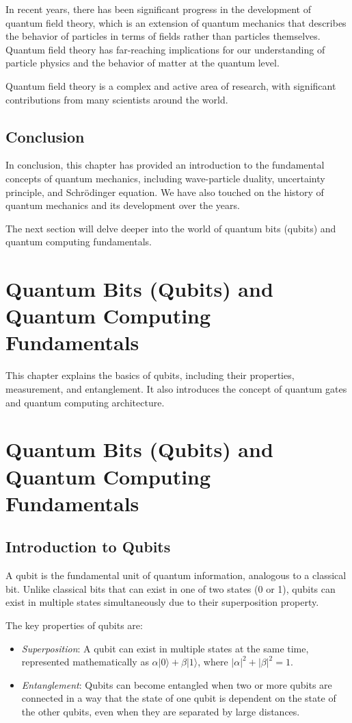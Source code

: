 \documentclass{report}%
\begin{document}
In recent years, there has been significant progress in the development of quantum field theory, which is an extension of quantum mechanics that describes the behavior of particles in terms of fields rather than particles themselves. Quantum field theory has far-reaching implications for our understanding of particle physics and the behavior of matter at the quantum level.

Quantum field theory is a complex and active area of research, with significant contributions from many scientists around the world.

\section*{Conclusion}

In conclusion, this chapter has provided an introduction to the fundamental concepts of quantum mechanics, including wave-particle duality, uncertainty principle, and Schrödinger equation. We have also touched on the history of quantum mechanics and its development over the years.

The next section will delve deeper into the world of quantum bits (qubits) and quantum computing fundamentals.%
\chapter{Quantum Bits (Qubits) and Quantum Computing Fundamentals}%
This chapter explains the basics of qubits, including their properties, measurement, and entanglement. It also introduces the concept of quantum gates and quantum computing architecture.

%
\chapter{Quantum Bits (Qubits) and Quantum Computing Fundamentals}

\section{Introduction to Qubits}

A qubit is the fundamental unit of quantum information, analogous to a classical bit. Unlike classical bits that can exist in one of two states (0 or 1), qubits can exist in multiple states simultaneously due to their superposition property.

The key properties of qubits are:

\begin{itemize}
\item \textit{Superposition}: A qubit can exist in multiple states at the same time, represented mathematically as $\alpha |0\rangle + \beta |1\rangle$, where $|\alpha|^2 + |\beta|^2 = 1$.
\item \textit{Entanglement}: Qubits can become entangled when two or more qubits are connected in a way that the state of one qubit is dependent on the state of the other qubits, even when they are separated by large distances.
\end{itemize}
\end{document}

